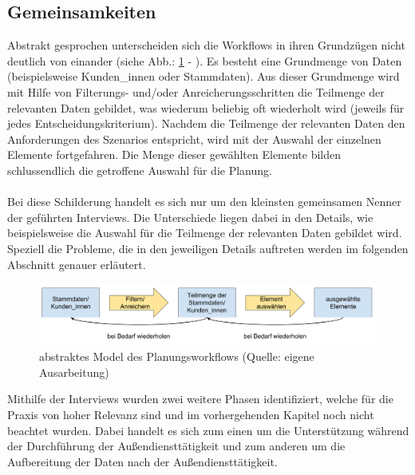 \documentclass[Bachelorarbeit.tex]{subfiles}
\begin{document}
\subsection{Gemeinsamkeiten}
\label{subsubsec:Ergebnisse der Interviews:gemeinsamkeiten}
Abstrakt gesprochen unterscheiden sich die Workflows in ihren Grundzügen nicht deutlich von einander (siehe Abb.: \ref{fig:abstrakterWorkflowPlannung} - ). 
Es besteht eine Grundmenge von Daten (beispielsweise Kunden\_innen oder Stammdaten). 
Aus dieser Grundmenge wird mit Hilfe von Filterungs- und/oder Anreicherungsschritten die Teilmenge der relevanten Daten gebildet, was wiederum beliebig oft wiederholt wird (jeweils für jedes Entscheidungskriterium).
Nachdem die Teilmenge der relevanten Daten den Anforderungen des Szenarios entspricht, wird mit der Auswahl der einzelnen Elemente fortgefahren.
Die Menge dieser gewählten Elemente bilden schlussendlich die getroffene Auswahl für die Planung.\\
\\
Bei diese Schilderung handelt es sich nur um den kleinsten gemeinsamen Nenner der geführten Interviews.
Die Unterschiede liegen dabei in den Details, wie beispielsweise die Auswahl für die Teilmenge der relevanten Daten gebildet wird.
Speziell die Probleme, die in den jeweiligen Details auftreten werden im folgenden Abschnitt genauer erläutert.

\begin{figure}[h]
	\includegraphics[width=\linewidth]{img/analyse/abstrakterWorkflowPlannung}
	\caption[abstrakter Planungsworkflow]{abstraktes Model des Planungsworkflows (Quelle: eigene Ausarbeitung)}
	\label{fig:abstrakterWorkflowPlannung}
\end{figure}

Mithilfe der Interviews wurden zwei weitere Phasen identifiziert, welche für die Praxis von hoher Relevanz sind und im vorhergehenden Kapitel noch nicht beachtet wurden.
Dabei handelt es sich zum einen um die Unterstützung während der Durchführung der Außendiensttätigkeit und zum anderen um die Aufbereitung der Daten nach der Außendiensttätigkeit.
\end{document}
